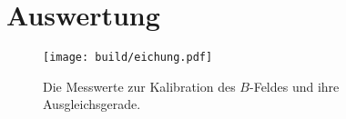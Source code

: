 \newpage
\section{Auswertung}
\label{sec:Auswertung}


\begin{figure}[htb]
  \centering
  \texttt{[image: build/eichung.pdf]}
  \caption{Die Messwerte zur Kalibration des $B$-Feldes und ihre Ausgleichsgerade.}
  \label{fig:eichung}
\end{figure}
\FloatBarrier